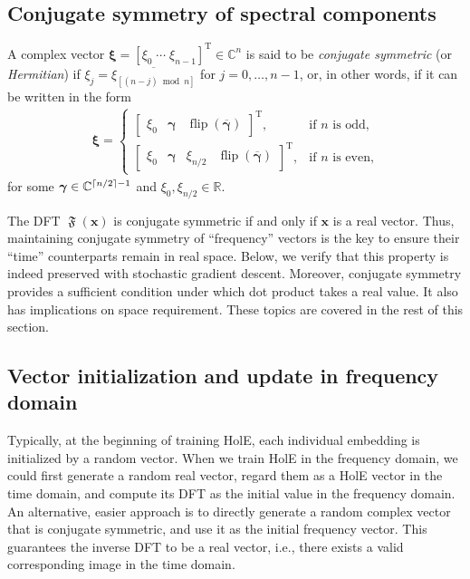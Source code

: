 \documentclass[11pt,a4paper]{article}
\DeclarePairedDelimiter{\ceil}{\lceil}{\rceil}
\def\mat#1{\boldsymbol{\mathbf{#1}}}
\def\transpose{^{\mathrm{T}}}
\def\Cset{\mathbb{C}}
\def\Rset{\mathbb{R}}
\def\DFT{\mathop{\mathfrak{F}}}
\def\flip{\mathop{\text{flip}}}
\begin{document}
\subsection{Conjugate symmetry of spectral components}
\label{sec:conjugacy}

A complex vector
$\mat{\xi} = [\xi_0 \; \cdots \; \xi_{n-1}]\transpose \in \Cset^{n}$
is said to be \emph{conjugate symmetric} (or \emph{Hermitian})
if
$\xi_j = \overline{\xi_{[(n-j) \bmod n]}}$ for $j = 0, \ldots, n-1$,
or, in other words,
if it can be written in the form
\begin{align*}
  \mat{\xi} =
  \begin{cases}
    \begin{bmatrix} \xi_0 & \mat{\gamma} &             \flip(\overline{\mat{\gamma}}) \end{bmatrix}\transpose, & \text{if $n$ is odd,} \\[3pt]
    \begin{bmatrix} \xi_0 & \mat{\gamma} & \xi_{n/2} & \flip(\overline{\mat{\gamma}}) \end{bmatrix}\transpose, & \text{if $n$ is even,}
  \end{cases}
\end{align*}
for some $\mat{\gamma} \in \Cset^{\ceil{n/2}-1}$ and $\xi_0, \xi_{n/2} \in \Rset$.

The DFT $\DFT(\mat{x})$ is conjugate symmetric
if and only if $\mat{x}$ is a real vector.
Thus,
maintaining conjugate symmetry of ``frequency'' vectors is the key to
ensure their ``time'' counterparts remain in real space.
Below, we verify that this property is indeed preserved with stochastic gradient descent.
Moreover, conjugate symmetry provides a sufficient condition under which dot product takes a real value.
It also has implications on space requirement. %
These topics are covered in the rest of this section.

\subsection{Vector initialization and update in frequency domain}
\label{sec:update}

Typically, at the beginning of training HolE,
each individual embedding is initialized by a random vector.
When we train HolE in the frequency domain,
we could first generate a random real vector,
regard them as a HolE vector in the time domain,
and compute its DFT as the initial value in the frequency domain.
An alternative, easier approach is to directly generate a random complex vector
that is conjugate symmetric, and use it as the initial frequency vector.
This guarantees the inverse DFT to be a real vector, i.e., there exists a valid corresponding image in the time domain.
\end{document}
